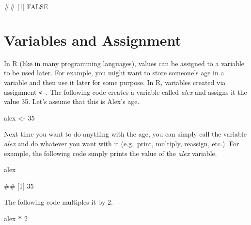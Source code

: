 \documentclass[
]{book}
\newenvironment{Shaded}{\begin{snugshade}}{\end{snugshade}}
\newcommand{\DecValTok}[1]{\textcolor[rgb]{0.00,0.00,0.81}{#1}}
\newcommand{\NormalTok}[1]{#1}
\newcommand{\OtherTok}[1]{\textcolor[rgb]{0.56,0.35,0.01}{#1}}
\newcommand{\SpecialCharTok}[1]{\textcolor[rgb]{0.81,0.36,0.00}{\textbf{#1}}}
\begin{document}
\begin{Shaded}
\begin{Highlighting}[]
\NormalTok{\#\# [1] FALSE}
\end{Highlighting}
\end{Shaded}

\section{Variables and Assignment}\label{variables-and-assignment}

In R (like in many programming languages), values can be assigned to a variable to be used later. For example, you might want to store someone's age in a variable and then use it later for some purpose. In R, variables created via assignment \texttt{\textless{}-}. The following code creates a variable called \emph{alex} and assigns it the value 35. Let's assume that this is Alex's age.

\begin{Shaded}
\begin{Highlighting}[]
\NormalTok{alex }\OtherTok{\textless{}{-}} \DecValTok{35}
\end{Highlighting}
\end{Shaded}

Next time you want to do anything with the age, you can simply call the variable \emph{alex} and do whatever you want with it (e.g.~print, multiply, reassign, etc.). For example, the following code simply prints the value of the \emph{alex} variable.

\begin{Shaded}
\begin{Highlighting}[]
\NormalTok{alex}
\end{Highlighting}
\end{Shaded}

\begin{Shaded}
\begin{Highlighting}[]
\NormalTok{\#\# [1] 35}
\end{Highlighting}
\end{Shaded}

The following code multiples it by 2.

\begin{Shaded}
\begin{Highlighting}[]
\NormalTok{alex }\SpecialCharTok{*} \DecValTok{2}
\end{Highlighting}
\end{Shaded}
\end{document}
